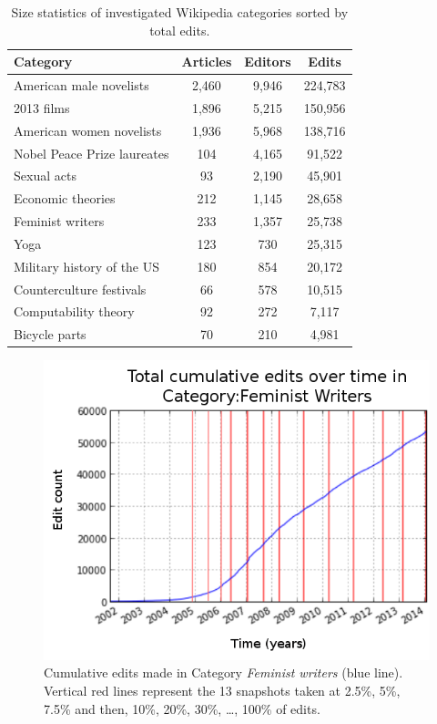 \begin{table}
\begin{tabular}{|l|c|c|c|}
\hline
{\bf Category} &  {\bf Articles} &  {\bf Editors} &  {\bf Edits} \\
\hline
American male novelists               &      2,460 &   9,946 &  224,783 \\
2013 films                            &      1,896 &   5,215 &  150,956 \\
American women novelists              &      1,936 &   5,968 &  138,716 \\
Nobel Peace Prize laureates           &       104 &   4,165 &   91,522 \\
Sexual acts                           &        93 &   2,190 &   45,901 \\
Economic theories                     &       212 &   1,145 &   28,658 \\
Feminist writers                      &       233 &   1,357 &   25,738 \\
Yoga                                  &       123 &    730 &   25,315 \\
Military history of the US &       180 &    854 &   20,172 \\
Counterculture festivals              &        66 &    578 &   10,515 \\
Computability theory                  &        92 &    272 &    7,117 \\
Bicycle parts                         &        70 &    210 &    4,981 \\
\hline
\end{tabular}
\caption{Size statistics of investigated Wikipedia categories sorted by total edits.}
\label{tab:statistics}
\end{table}

\begin{figure}[!t]
\centering
\includegraphics[width=0.9\columnwidth]{../Figures/cumulative_snapshots_Feminist_Writers_thirteen.png}
\caption{Cumulative edits made in Category {\it Feminist writers} (blue line). Vertical red lines represent the 13 snapshots taken at 2.5\%, 5\%, 7.5\% and then, 10\%, 20\%, 30\%, \ldots , 100\% of edits.}
\label{fig:snapshots}
\end{figure}


